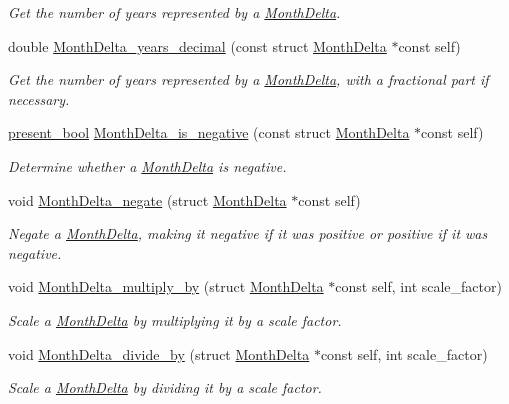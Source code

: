 \begin{DoxyCompactItemize}
\begin{DoxyCompactList}\small\item\em Get the number of years represented by a \hyperlink{structMonthDelta}{Month\-Delta}. \end{DoxyCompactList}\item 
double \hyperlink{month-delta_8h_a9215cb412f007649e357ba8cd9e171b9}{Month\-Delta\-\_\-years\-\_\-decimal} (const struct \hyperlink{structMonthDelta}{Month\-Delta} $\ast$const self)
\begin{DoxyCompactList}\small\item\em Get the number of years represented by a \hyperlink{structMonthDelta}{Month\-Delta}, with a fractional part if necessary. \end{DoxyCompactList}\item 
\hyperlink{types_8h_a1c24e2cdd988b886e889080ded176ae0}{present\-\_\-bool} \hyperlink{month-delta_8h_ada77ded958313a9162d1a7337b0374c7}{Month\-Delta\-\_\-is\-\_\-negative} (const struct \hyperlink{structMonthDelta}{Month\-Delta} $\ast$const self)
\begin{DoxyCompactList}\small\item\em Determine whether a \hyperlink{structMonthDelta}{Month\-Delta} is negative. \end{DoxyCompactList}\item 
void \hyperlink{month-delta_8h_a4d77c910d4ec5841e5e3f59d63490078}{Month\-Delta\-\_\-negate} (struct \hyperlink{structMonthDelta}{Month\-Delta} $\ast$const self)
\begin{DoxyCompactList}\small\item\em Negate a \hyperlink{structMonthDelta}{Month\-Delta}, making it negative if it was positive or positive if it was negative. \end{DoxyCompactList}\item 
void \hyperlink{month-delta_8h_a24e21fbf270d561b1dccf2ab9e083ba0}{Month\-Delta\-\_\-multiply\-\_\-by} (struct \hyperlink{structMonthDelta}{Month\-Delta} $\ast$const self, int scale\-\_\-factor)
\begin{DoxyCompactList}\small\item\em Scale a \hyperlink{structMonthDelta}{Month\-Delta} by multiplying it by a scale factor. \end{DoxyCompactList}\item 
void \hyperlink{month-delta_8h_ad7d99e42e53f6f55ef885d754f433500}{Month\-Delta\-\_\-divide\-\_\-by} (struct \hyperlink{structMonthDelta}{Month\-Delta} $\ast$const self, int scale\-\_\-factor)
\begin{DoxyCompactList}\small\item\em Scale a \hyperlink{structMonthDelta}{Month\-Delta} by dividing it by a scale factor. \end{DoxyCompactList}\item 

\end{DoxyCompactItemize}
